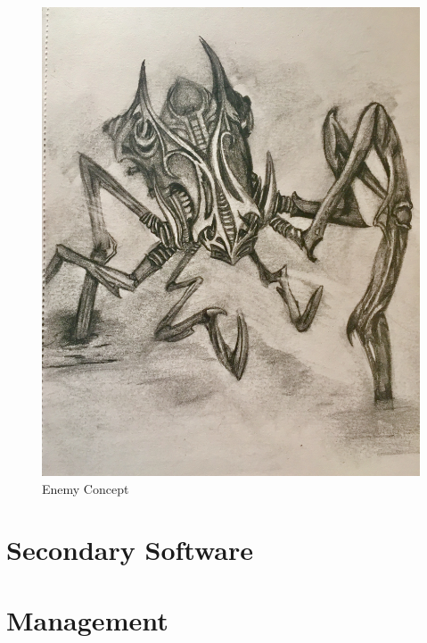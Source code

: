 \documentclass[12pt,titlepage]{article}
\begin{document}
\begin{figure}[H]
    \caption{Enemy Concept}
    \label{fig:enemy_concept}
    \centering
    \includegraphics[width=0.35\textheight]{../../graphics/spider}
\end{figure}

\newpage
\section{Secondary Software}

\newpage
\section{Management}
\end{document}
